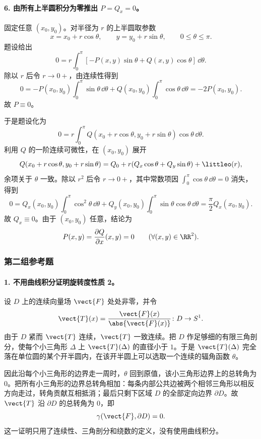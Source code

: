 \paragraph{6. 由所有上半圆积分为零推出 $P=Q_x=0$。}
\begin{xsolution}
固定任意 $(x_0,y_0)$。对半径为 $r$ 的上半圆取参数
\[
  x=x_0+r\cos\theta,
  \qquad y=y_0+r\sin\theta,
  \qquad0\le\theta\le\pi.
\]
题设给出
\[
  0=r\int_0^\pi
  \left[-P(x,y)\sin\theta+Q(x,y)\cos\theta\right]\,\dd\theta.
\]
除以 $r$ 后令 $r\to0+$，由连续性得到
\[
  0=-P(x_0,y_0)\int_0^\pi\sin\theta\,\dd\theta
    +Q(x_0,y_0)\int_0^\pi\cos\theta\,\dd\theta
  =-2P(x_0,y_0).
\]
故 $P\equiv0$。

于是题设化为
\[
  0=r\int_0^\pi Q(x_0+r\cos\theta,y_0+r\sin\theta)
  \cos\theta\,\dd\theta.
\]
利用 $Q$ 的一阶连续可微性，在 $(x_0,y_0)$ 展开
\[
  Q(x_0+r\cos\theta,y_0+r\sin\theta)
  =Q_0+r(Q_x\cos\theta+Q_y\sin\theta)+\littleo(r),
\]
余项关于 $\theta$ 一致。除以 $r^2$ 后令 $r\to0+$，其中常数项因 $\int_0^\pi\cos\theta\,\dd\theta=0$ 消失，得到
\[
  0=Q_x(x_0,y_0)\int_0^\pi\cos^2\theta\,\dd\theta
    +Q_y(x_0,y_0)\int_0^\pi\sin\theta\cos\theta\,\dd\theta
  =\frac\pi2Q_x(x_0,y_0).
\]
故 $Q_x\equiv0$。由于 $(x_0,y_0)$ 任意，结论为
\[
  P(x,y)=\frac{\partial Q}{\partial x}(x,y)=0
  \qquad(\forall(x,y)\in\RR^2).
\]
\end{xsolution}

\subsubsection*{第二组参考题}

\paragraph{1. 不用曲线积分证明旋转度性质 2。}
\begin{xsolution}
设 $D$ 上的连续向量场 $\vect{F}$ 处处非零，并令
\[
  \vect{T}(x)=\frac{\vect{F}(x)}{\abs{\vect{F}(x)}}\colon D\to S^1.
\]
由于 $D$ 紧而 $\vect{T}$ 连续，$\vect{T}$ 一致连续。把 $D$ 作足够细的有限三角剖分，使每个小三角形 $\Delta$ 上 $\vect{T}(\Delta)$ 的直径小于 $1$。于是 $\vect{T}(\Delta)$ 完全落在单位圆的某个开半圆内，在该开半圆上可以选取一个连续的辐角函数 $\theta$。

因此沿每个小三角形的边界走一周时，$\theta$ 回到原值，该小三角形边界上的总转角为 $0$。把所有小三角形的边界总转角相加：每条内部公共边被两个相邻三角形以相反方向走过，转角贡献互相抵消；最后只剩下区域 $D$ 的全部定向边界 $\partial D$。故 $\vect{T}$ 沿 $\partial D$ 的总转角为 $0$，即
\[
  \gamma(\vect{F},\partial D)=0.
\]
这一证明只用了连续性、三角剖分和绕数的定义，没有使用曲线积分。
\end{xsolution}

